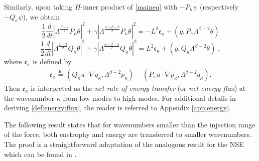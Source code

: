 \documentclass[twoside, reqno]{amsart}
\numberwithin{lemma}{section}
\numberwithin{theorem}{section}
\numberwithin{proposition}{section}
\numberwithin{equation}{section} %
\newcommand{\te}{\theta}
\newcommand{\ga}{\gamma}
\newcommand{\la}{\Lambda}
\newcommand{\be}{\beta}
\newcommand{\kap}{\kappa}
\newcommand{\Lam}{\Lambda}
\begin{document}
Similarly, {upon taking $H$-inner product of \eqref{maineq} with $-P_{\kappa}\psi$ (respectively $-Q_{\kappa}\psi$)}, we obtain
\begin{equation*}
        \frac{1}{2} \frac{d}{dt} |\la^{\frac{\beta-2}{2}} P_{\kappa}\te|^2 + \ga|\la^{\frac{\alpha+\beta-2}{2}} P_{\kappa}\te|^2 =  -L^2\mathfrak{e}_{\kappa} + (g,P_{\kappa}\la^{\beta-2}\te)
\end{equation*}
\begin{equation*}
        \frac{1}{2} \frac{d}{dt} |\la^{\frac{\beta-2}{2}} Q_{\kappa}\te|^2 + \ga|\la^{\frac{\alpha+\beta-2}{2}} Q_{\kappa}\te|^2 = L^2\mathfrak{e}_{\kappa} + (g,Q_{\kappa}\la^{\beta-2}\te)\;,
\end{equation*}
{where $\mathfrak{e}_{\kappa}$ is defined by
    \begin{align}\label{def:energy:flux}
        \mathfrak{e}_{\kappa}\overset{\text{def}}{=}(Q_\kap u\cdotp\nabla q_\kap,\Lam^{\be-2}p_\kap)-(P_\kap u\cdotp\nabla p_\kap,\Lam^{\be-2}q_\kap).
    \end{align}
Then $\mathfrak{e}_{\kappa}$ is interpreted as} the {\it net rate of energy transfer} (or {\it net energy flux}) at the wavenumber $\kappa$ {from low modes to high modes}. For additional details in deriving \eqref{def:energy:flux}, the reader is referred to Appendix \ref{app:energy}.


The following {result} states that for wavenumbers smaller than the injection range of the force, both enstrophy and energy are transferred to smaller wavenumbers. {The proof is a straightforward adaptation of the analogous result for the NSE which can be found in \cite{FJMR2002}.}
\end{document}
